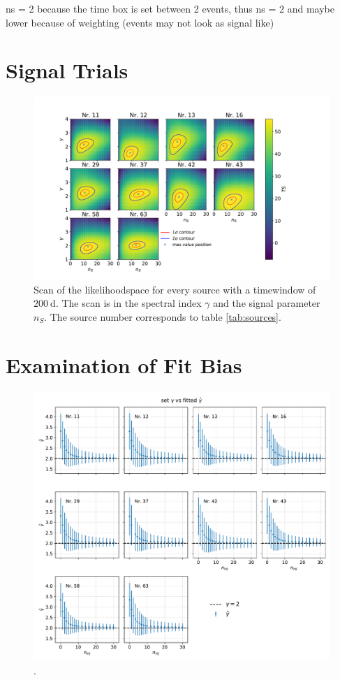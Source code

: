 ns = 2 because the time box is set between 2 events, thus ns = 2 and maybe lower because of weighting (events may not look as signal like)
\section{Signal Trials}

\begin{figure}
    \centering
    \includegraphics[width=\linewidth]{Plots/05_csky/llh_scan.pdf}
    \caption{Scan of the likelihoodspace for every source with a timewindow of $\SI{200}{\day}$. The scan is in the spectral index $\gamma$ and the signal parameter $n_S$. The source number corresponds to table \ref{tab:sources}.}
    \label{fig:llh_scan_time_dep}
\end{figure}

\section{Examination of Fit Bias}

\begin{figure}
    \centering
    \includegraphics[width=\linewidth]{Plots/05_csky/gamma_fit_time_dep.pdf}
    \caption{.}
    \label{fig:gamma_fit_time_dep}
\end{figure}

